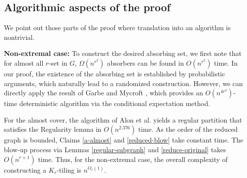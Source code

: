 \documentclass[11pt, a4paper]{article}
\theoremstyle{definition}
\newcommand{\<}{\subseteq}
\begin{document}
\subsection{Algorithmic aspects of the proof}

We point out those parts of the proof where translation into an algorithm is nontrivial. 

\medskip
\textbf{Non-extremal case:} To construct the desired absorbing set, we first note that for almost all $r$-set in $G$, $\Omega(n^{r^2})$ absorbers can be found in $O(n^{r^2})$ time.  In our proof, the existence of the absorbing set is established by probabilistic arguments, which naturally lead to a randomized construction. However, we can directly apply the result of Garbe and Mycroft \cite[Proposition 4.7]{GM2018}, which provides an $O(n^{4r^2})$-time deterministic algorithm via the conditional expectation method.%

For the almost cover, the algorithm of Alon et al. \cite{ADLR1994} yields a regular partition that satisfies the Regularity lemma in $O(n^{2.376})$ time. As the order of the reduced graph is bounded, Claims \ref{a-almost} and \ref{reduced-blow} take constant time. The blow-up process via Lemmas \ref{regular-subgraph} and \ref{reduce-original} takes $O(n^{r+1})$ time.  Thus, for the non-extremal case, the overall complexity of constructing a $K_r$-tiling is $n^{O_r(1)}$.%


\end{document}
